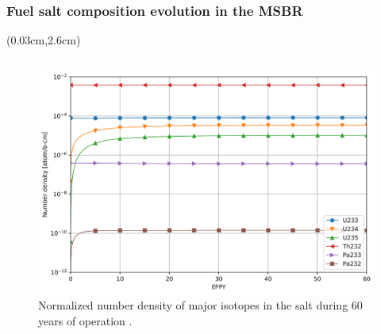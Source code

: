 \begin{frame}
\frametitle{Fuel salt composition evolution in the MSBR}
\begin{textblock*}{12.8cm}(0.03cm,2.6cm) %
\begin{columns}
	\column[t]{7cm}
	\vspace{-0.35in}
	\begin{figure}[t]
		\hspace{-5mm}
		\includegraphics[height=0.69\textheight]{../dissertation/figures/ch3/major_isotopes_adens.png}
		\vspace{-0.15in}
		\caption{Normalized number density of major isotopes in the salt
			during 60 years of operation \cite{rykhlevskii_advanced_2018}.}
	\end{figure}
	

\end{columns}
\end{textblock*}
\end{frame}
